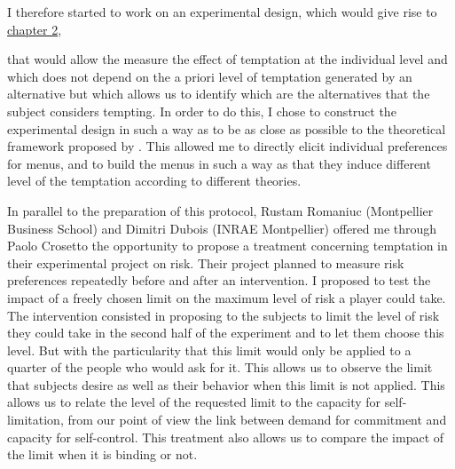 \documentclass[
]{book}
\begin{document}
I therefore started to work on an experimental design, which would give rise to
\protect\hyperlink{tempting-lab}{chapter 2},

that would allow the measure the effect of temptation at the
individual level and which does not depend on the a priori level of temptation generated by an
alternative but which allows us to identify which are the alternatives that the
subject considers tempting.
In order to do this, I chose to construct the experimental design in such a way
as to be as close as possible to the theoretical framework proposed by
\citet{gul2001temptation}.
This allowed me to directly elicit individual preferences for menus, and to build the
menus in such a way as that they induce different level of the temptation
according to different theories.

In parallel to the preparation of this protocol, Rustam Romaniuc (Montpellier Business School) and Dimitri
Dubois (INRAE Montpellier) offered me through Paolo Crosetto the opportunity to propose a treatment
concerning temptation in their experimental project on risk.
Their project planned to measure risk preferences repeatedly before and after an
intervention.
I proposed to test the impact of a freely chosen limit on the maximum level of
risk a player could take.
The intervention consisted in proposing to the subjects to limit the level of
risk they could take in the second half of the experiment and to let them choose
this level.
But with the particularity that this limit would only be applied to a quarter of
the people who would ask for it.
This allows us to observe the limit that subjects desire as well as their
behavior when this limit is not applied.
This allows us to relate the level of the requested limit to the capacity for
self-limitation, from our point of view the link between demand for commitment
and capacity for self-control.
This treatment also allows us to compare the impact of the limit when it is
binding or not.
\end{document}
